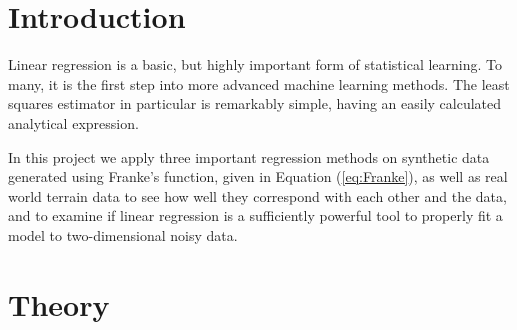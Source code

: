 \documentclass[a4paper, 10pt]{article}
\begin{document}
\begin{multicols}{2}
\section{Introduction}

Linear regression is a basic, but highly important form of statistical learning. To many, it is the first step into more advanced machine learning methods. The least squares estimator in particular is remarkably simple, having an easily calculated analytical expression.

In this project we apply three important regression methods on synthetic data generated using Franke's function, given in Equation (\ref{eq:Franke}), as well as real world terrain data to see how well they correspond with each other and the data, and to examine if linear regression is a sufficiently powerful tool to properly fit a model to two-dimensional noisy data.


\section{Theory}

\end{multicols}
\end{document}
